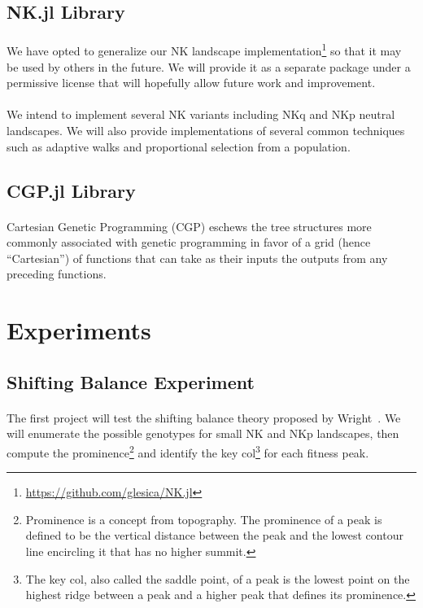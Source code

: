 \documentclass[12pt,letterpaper,titlepage,draft]{article}
\begin{document}
\subsection{NK.jl Library}

\paragraph{}
We have opted to generalize our NK landscape
implementation\footnote{\url{https://github.com/glesica/NK.jl}} so that it may
be used by others in the future. We will provide it as a separate package under
a permissive license that will hopefully allow future work and improvement.

\paragraph{}
We intend to implement several NK variants including NKq and NKp neutral
landscapes. We will also provide implementations of several common techniques
such as adaptive walks and proportional selection from a population.

\subsection{CGP.jl Library}

\paragraph{}
Cartesian Genetic Programming (CGP) eschews the tree structures more commonly
associated with genetic programming in favor of a grid (hence ``Cartesian'') of
functions that can take as their inputs the outputs from any preceding
functions.

\section{Experiments}

\subsection{Shifting Balance Experiment}

\paragraph{}
The first project will test the shifting balance theory proposed by
Wright~\cite{Wright1982}\cite{Wright1931}. We will enumerate the possible
genotypes for small NK and NKp landscapes, then compute the
prominence\footnote{Prominence is a concept from topography. The prominence of
a peak is defined to be the vertical distance between the peak and the
lowest contour line encircling it that has no higher summit.} and identify the
key col\footnote{The key col, also called the saddle point, of a peak is the
lowest point on the highest ridge between a peak and a higher peak that
defines its prominence.} for each fitness peak.
\end{document}

